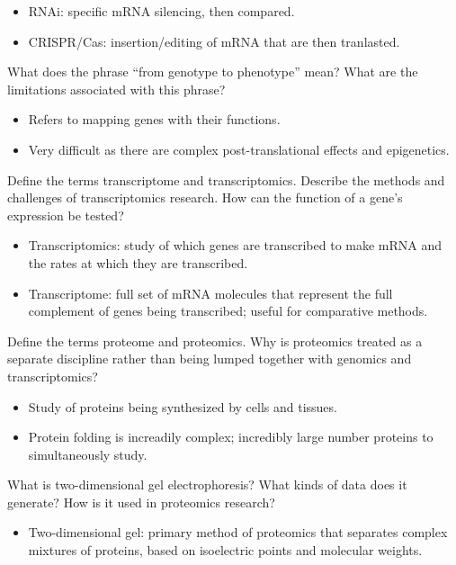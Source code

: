 \documentclass[12pt,a4paper]{article}
\begin{document}
\begin{itemize}
\begin{itemize}
            \item RNAi: specific mRNA silencing, then compared. 
            \item CRISPR/Cas: insertion/editing of mRNA that are then tranlasted. 
        \end{itemize}
    {\color{G-Moon}\item What does the phrase “from genotype to phenotype” mean? What are the limitations associated with this phrase?}
        \begin{itemize}
            \item Refers to mapping genes with their functions. 
            \item Very difficult as there are complex post-translational effects and epigenetics.
        \end{itemize}
    {\color{G-Moon}\item Define the terms transcriptome and transcriptomics. Describe the methods and challenges of transcriptomics research. How can the function of a gene’s expression be tested?}
        \begin{itemize}
            \item Transcriptomics: study of which genes are transcribed to make mRNA and the rates at which they are transcribed.
            \item Transcriptome: full set of mRNA molecules that represent the full complement of genes being transcribed; useful for comparative methods.
        \end{itemize}
    {\color{G-Moon}\item Define the terms proteome and proteomics. Why is proteomics treated as a separate discipline rather than being lumped together with genomics and transcriptomics?}
        \begin{itemize}
            \item Study of proteins being synthesized by cells and tissues.
            \item Protein folding is increadily complex; incredibly large number proteins to simultaneously study.
        \end{itemize}
    {\color{G-Moon}\item What is two-dimensional gel electrophoresis? What kinds of data does it generate? How is it used in proteomics research?}
        \begin{itemize}
            \item Two-dimensional gel: primary method of proteomics that separates complex mixtures of proteins, based on isoelectric points and molecular weights.

\end{itemize}
\end{itemize}
\end{document}
